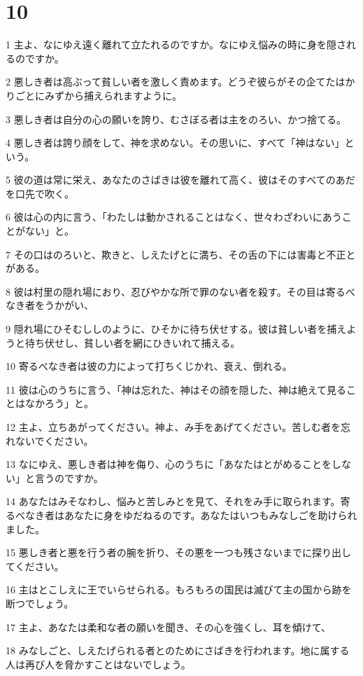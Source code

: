 \chapter{10}

\par 1 主よ、なにゆえ遠く離れて立たれるのですか。なにゆえ悩みの時に身を隠されるのですか。
\par 2 悪しき者は高ぶって貧しい者を激しく責めます。どうぞ彼らがその企てたはかりごとにみずから捕えられますように。
\par 3 悪しき者は自分の心の願いを誇り、むさぼる者は主をのろい、かつ捨てる。
\par 4 悪しき者は誇り顔をして、神を求めない。その思いに、すべて「神はない」という。
\par 5 彼の道は常に栄え、あなたのさばきは彼を離れて高く、彼はそのすべてのあだを口先で吹く。
\par 6 彼は心の内に言う、「わたしは動かされることはなく、世々わざわいにあうことがない」と。
\par 7 その口はのろいと、欺きと、しえたげとに満ち、その舌の下には害毒と不正とがある。
\par 8 彼は村里の隠れ場におり、忍びやかな所で罪のない者を殺す。その目は寄るべなき者をうかがい、
\par 9 隠れ場にひそむししのように、ひそかに待ち伏せする。彼は貧しい者を捕えようと待ち伏せし、貧しい者を網にひきいれて捕える。
\par 10 寄るべなき者は彼の力によって打ちくじかれ、衰え、倒れる。
\par 11 彼は心のうちに言う、「神は忘れた、神はその顔を隠した、神は絶えて見ることはなかろう」と。
\par 12 主よ、立ちあがってください。神よ、み手をあげてください。苦しむ者を忘れないでください。
\par 13 なにゆえ、悪しき者は神を侮り、心のうちに「あなたはとがめることをしない」と言うのですか。
\par 14 あなたはみそなわし、悩みと苦しみとを見て、それをみ手に取られます。寄るべなき者はあなたに身をゆだねるのです。あなたはいつもみなしごを助けられました。
\par 15 悪しき者と悪を行う者の腕を折り、その悪を一つも残さないまでに探り出してください。
\par 16 主はとこしえに王でいらせられる。もろもろの国民は滅びて主の国から跡を断つでしょう。
\par 17 主よ、あなたは柔和な者の願いを聞き、その心を強くし、耳を傾けて、
\par 18 みなしごと、しえたげられる者とのためにさばきを行われます。地に属する人は再び人を脅かすことはないでしょう。

